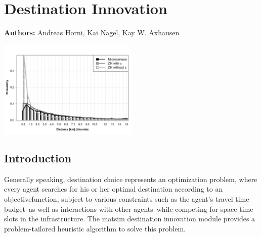 \chapter{Destination Innovation}
\label{ch:destinationchoice}
\hfill \textbf{Authors:} Andreas Horni, Kai Nagel, Kay W. Axhausen

\begin{center} \includegraphics[width=0.5\textwidth, angle=0]{extending/figures/dc/zhLeisure.pdf} \end{center}



\section{Introduction}
%
Generally speaking, destination choice represents an optimization problem, where every agent searches for his or her optimal destination according to an \gls{objectivefunction}, subject to various constraints such as the agent's travel time budget--as well as interactions with other agents--while competing for space-time slots in the infrastructure. The \gls{matsim} destination innovation module provides a problem-tailored heuristic algorithm to solve this problem.


